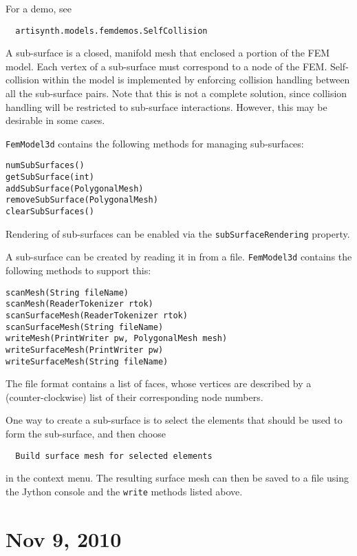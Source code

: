 \documentclass{article}
\begin{document}
For a demo, see 

\begin{verbatim}
  artisynth.models.femdemos.SelfCollision
\end{verbatim}

A sub-surface is a closed, manifold mesh that enclosed a portion of
the FEM model. Each vertex of a sub-surface must correspond to a node
of the FEM. Self-collision within the model is implemented by
enforcing collision handling between all the sub-surface pairs.  Note
that this is not a complete solution, since collision handling will be
restricted to sub-surface interactions. However, this may be desirable
in some cases.

{\tt FemModel3d} contains the following methods for managing sub-surfaces:

\begin{lstlisting}[]
numSubSurfaces()
getSubSurface(int)
addSubSurface(PolygonalMesh)
removeSubSurface(PolygonalMesh)
clearSubSurfaces()
\end{lstlisting}

Rendering of sub-surfaces can be enabled via the
{\tt subSurfaceRendering} property.

A sub-surface can be created by reading it in from a file. {\tt FemModel3d}
contains the following methods to support this:

\begin{lstlisting}[]
scanMesh(String fileName)
scanMesh(ReaderTokenizer rtok)
scanSurfaceMesh(ReaderTokenizer rtok)
scanSurfaceMesh(String fileName)
writeMesh(PrintWriter pw, PolygonalMesh mesh)
writeSurfaceMesh(PrintWriter pw)
writeSurfaceMesh(String fileName)
\end{lstlisting}

The file format contains a list of faces, whose vertices are described
by a (counter-clockwise) list of their corresponding node numbers.

One way to create a sub-surface is to select the elements that should
be used to form the sub-surface, and then choose

\begin{verbatim}
  Build surface mesh for selected elements
\end{verbatim}

in the context menu. The resulting surface mesh can then be saved to a
file using the Jython console and the {\tt write} methods listed above.

\section*{Nov 9, 2010}
\end{document}
